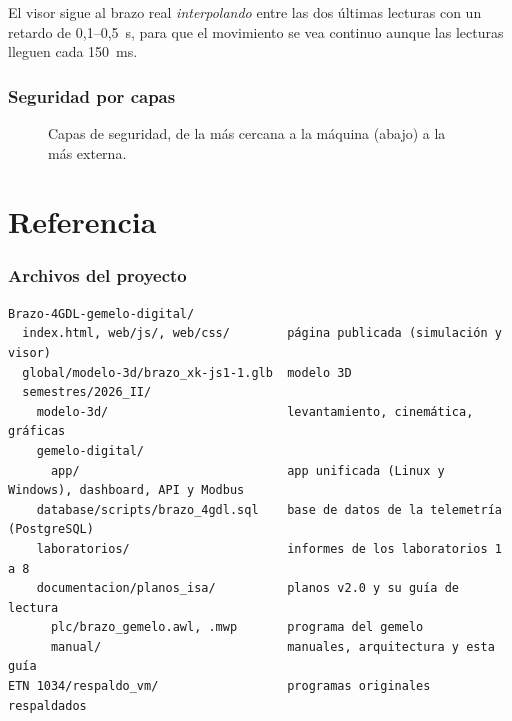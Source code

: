 \documentclass[a4paper,11pt]{article}
\begin{document}
El visor sigue al brazo real \emph{interpolando} entre las dos últimas lecturas con un retardo de 0,1--0,5~s, para que el movimiento se vea continuo aunque las lecturas lleguen cada 150~ms.



\section{Seguridad por capas}
\begin{figure}[H]
\centering
{}
\caption{Capas de seguridad, de la más cercana a la máquina (abajo) a la más externa.}
\end{figure}

\part{Referencia}

\section{Archivos del proyecto}
\begin{lstlisting}
Brazo-4GDL-gemelo-digital/
  index.html, web/js/, web/css/        página publicada (simulación y visor)
  global/modelo-3d/brazo_xk-js1-1.glb  modelo 3D
  semestres/2026_II/
    modelo-3d/                         levantamiento, cinemática, gráficas
    gemelo-digital/
      app/                             app unificada (Linux y Windows), dashboard, API y Modbus
    database/scripts/brazo_4gdl.sql    base de datos de la telemetría (PostgreSQL)
    laboratorios/                      informes de los laboratorios 1 a 8
    documentacion/planos_isa/          planos v2.0 y su guía de lectura
      plc/brazo_gemelo.awl, .mwp       programa del gemelo
      manual/                          manuales, arquitectura y esta guía
ETN 1034/respaldo_vm/                  programas originales respaldados
\end{lstlisting}
\end{document}
